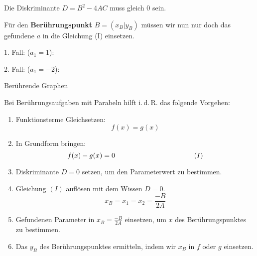 Die Diskriminante $D=B^2 - 4AC$ muss gleich 0 sein. 

\newpage

Für den \textbf{Berührungspunkt} $B=(x_B|y_B)$ müssen wir nun nur doch das gefundene
$a$ in die Gleichung (I) einsetzen.





1. Fall: ($a_1=1$):




2. Fall: ($a_1=-2$):


\newpage




\begin{rezept}{Berührende Graphen}{}

  Bei Berührungsaufgaben mit Parabeln hilft i.\,d.\,R. das folgende
  Vorgehen:

  \begin{enumerate}
  \item Funktionsterme Gleichsetzen: $$f(x) = g(x)$$
  \item In Grundform bringen: $$f(x) - g(x) = 0  \hspace{40mm}
    (I)$$
  \item Diskriminante $D = 0 $ setzen, um den Parameterwert zu
    bestimmen.
  \item Gleichung $(I)$ auflösen mit dem Wissen $D=0$.
    $$x_B=x_1=x_2= \frac{-B}{2A}$$

  \item Gefundenen Parameter in $x_B=\frac{-B}{2A}$ einsetzen, um $x$
    des Berührungspunktes zu bestimmen.
  \item Das $y_B$ des Berührungspunktes ermitteln, indem wir $x_B$ in
    $f$ oder $g$ einsetzen.
    \end{enumerate}
\end{rezept}


